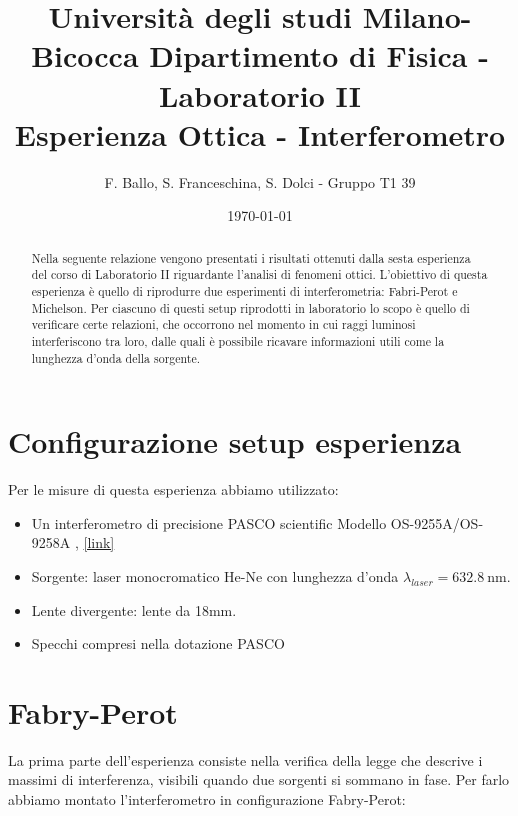 \documentclass[letterpaper,12pt]{article}
\begin{document}
\title{{\small Università degli studi Milano-Bicocca  Dipartimento di Fisica - Laboratorio II }\\
	Esperienza Ottica - Interferometro}
\author{F. Ballo, S. Franceschina, S. Dolci - Gruppo T1 39}
\date{\today}
\maketitle
\thispagestyle{logoheader}


\begin{abstract}
	Nella seguente relazione vengono presentati i risultati ottenuti dalla sesta esperienza del corso di 
    Laboratorio II riguardante l'analisi di fenomeni ottici.
    L'obiettivo di questa esperienza è quello di riprodurre due esperimenti di interferometria: Fabri-Perot e Michelson.
    Per ciascuno di questi setup riprodotti in laboratorio lo scopo è quello di verificare certe relazioni, che occorrono
    nel momento in cui raggi luminosi interferiscono tra loro, dalle quali è possibile ricavare informazioni utili come 
    la lunghezza d'onda della sorgente.
	\begin{adjustwidth}{-1cm}{-1cm}
	\end{adjustwidth}
\end{abstract}
\tableofcontents
\newpage

\section{Configurazione setup esperienza}
Per le misure di questa esperienza abbiamo utilizzato:

\begin{itemize}
    \item Un interferometro di precisione PASCO scientific Modello OS-9255A/OS-9258A , \href{https://www.pasco.com/products/lab-apparatus/light-and-optics/advanced-optics/os-9255}{[link]}
    \item Sorgente: laser monocromatico He-Ne con lunghezza d'onda $\lambda_{laser} = \SI{632.8}{\nano\meter}$.
    \item Lente divergente: lente da 18mm.
    \item Specchi compresi nella dotazione PASCO
\end{itemize}


\section{Fabry-Perot}
La prima parte dell'esperienza consiste nella verifica della legge che descrive
i massimi di interferenza, visibili quando due sorgenti si sommano in fase. 
Per farlo abbiamo montato l'interferometro in configurazione Fabry-Perot:
\end{document}
